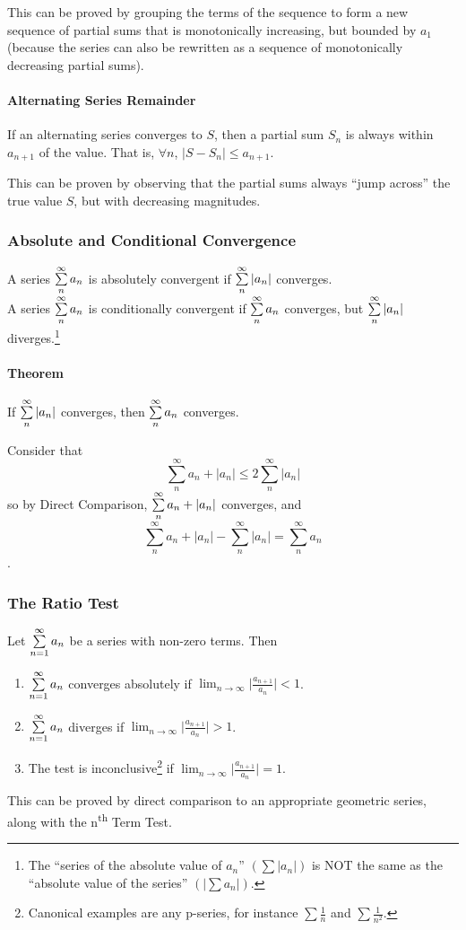 \documentclass{article}
\begin{document}
This can be proved by grouping the terms of the sequence to form a new sequence of partial sums that is monotonically increasing, but bounded by $a_1$ (because the series can also be rewritten as a sequence of monotonically decreasing partial sums).

\paragraph{Alternating Series Remainder} If an alternating series converges to $S$, then a partial sum $S_n$ is always within $a_{n+1}$ of the value. That is, $\forall n$, $|S-S_n| \le a_{n+1}$.

This can be proven by observing that the partial sums always ``jump across'' the true value $S$, but with decreasing magnitudes.

\subsubsection{Absolute and Conditional Convergence}
A series $\sum_{n}^{\infty}\limits a_n$ is absolutely convergent if $\sum_{n}^{\infty}\limits |a_n|$ converges.\\
A series $\sum_{n}^{\infty}\limits a_n$ is conditionally convergent if $\sum_{n}^{\infty}\limits a_n$ converges, but $\sum_{n}^{\infty}\limits |a_n|$ diverges.\footnote{The ``series of the absolute value of $a_n$'' $\left(\sum|a_n|\right)$ is NOT the same as the ``absolute value of the series'' $\left(|\sum a_n|\right)$.}

\paragraph{Theorem} If $\sum_{n}^{\infty}\limits |a_n|$ converges, then $\sum_{n}^{\infty}\limits a_n$ converges.

Consider that $$\sum_{n}^{\infty}a_n + |a_n| \le 2\sum_{n}^{\infty}|a_n|$$
so by Direct Comparison, $\sum_{n}^{\infty}\limits a_n + |a_n|$ converges, and $$\sum_{n}^{\infty} a_n + |a_n| - \sum_{n}^{\infty} |a_n| = \sum_{n}^{\infty} a_n$$.

\subsubsection{The Ratio Test}
Let $\sum_{n=1}^{\infty}\limits a_n$ be a series with non-zero terms. Then
\begin{enumerate}
    \item $\sum_{n=1}^{\infty}\limits a_n$ converges absolutely if $\lim_{n\to\infty}\limits\lvert \frac{a_{n+1}}{a_n} \rvert < 1$.
    \item $\sum_{n=1}^{\infty}\limits a_n$ diverges if $\lim_{n\to\infty}\limits\lvert \frac{a_{n+1}}{a_n} \rvert > 1$.
    \item The test is inconclusive\footnote{Canonical examples are any p-series, for instance $\sum\frac{1}{n}$ and $\sum\frac{1}{n^2}$.} if $\lim_{n\to\infty}\limits\lvert \frac{a_{n+1}}{a_n} \rvert = 1$.
\end{enumerate}
This can be proved by direct comparison to an appropriate geometric series, along with the n\textsuperscript{th} Term Test.
\end{document}
